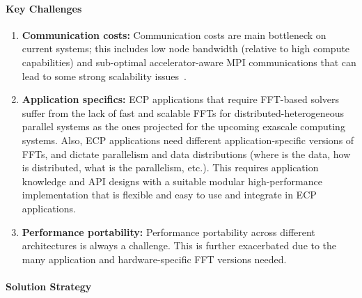 \paragraph{Key  Challenges}
\begin{enumerate}
\item
\textbf{Communication costs:}
Communication costs are main bottleneck 
on current systems; this includes low node bandwidth (relative to 
high compute capabilities) and sub-optimal accelerator-aware MPI 
communications that can lead to some strong scalability issues~\cite{heffte-pact21}.

\item
\textbf{Application specifics:}
ECP applications that require FFT-based solvers suffer from the lack of fast 
and scalable FFTs for distributed-heterogeneous parallel systems 
as the ones projected for the upcoming exascale computing systems. Also, ECP 
applications need different application-specific versions of FFTs,
and dictate parallelism and data distributions (where is the data, how is 
distributed, what is the parallelism, etc.). This requires application
knowledge and API designs with a suitable modular high-performance 
implementation that is flexible and easy to use and integrate in ECP applications.

\item
\textbf{Performance portability:}
Performance portability across different architectures is always a challenge.
This is further exacerbated due to the many application and 
hardware-specific FFT versions needed.
\end{enumerate}

\paragraph{Solution Strategy}

